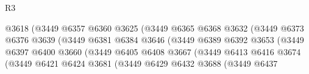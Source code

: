 \begin{lexlean}{R3}
\begin{coremodule}
                                            @3618
                                            (@3449
                                              @6357
                                              @6360
                                              @3625
                                              (@3449
                                                @6365
                                                @6368
                                                @3632
                                                (@3449
                                                  @6373
                                                  @6376
                                                  @3639
                                                  (@3449
                                                    @6381
                                                    @6384
                                                    @3646
                                                    (@3449
                                                      @6389
                                                      @6392
                                                      @3653
                                                      (@3449
                                                        @6397
                                                        @6400
                                                        @3660
                                                        (@3449
                                                          @6405
                                                          @6408
                                                          @3667
                                                          (@3449
                                                            @6413
                                                            @6416
                                                            @3674
                                                            (@3449
                                                              @6421
                                                              @6424
                                                              @3681
                                                              (@3449
                                                                @6429
                                                                @6432
                                                                @3688
                                                                (@3449
                                                                  @6437

\end{coremodule}
\end{lexlean}
